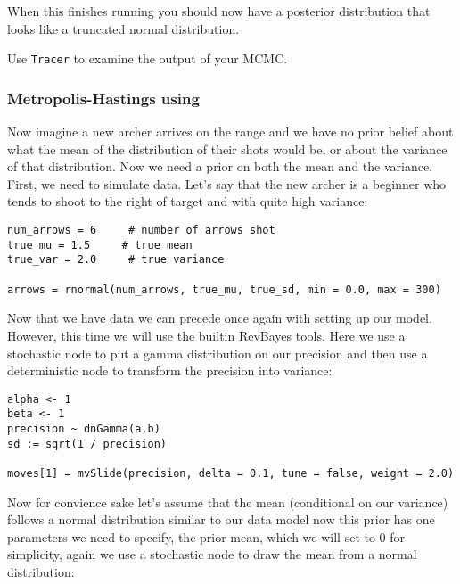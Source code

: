 When this finishes running you should now have a posterior distribution that looks like a truncated normal distribution. 

{\begin{framed}

Use {\tt Tracer} to examine the output of your MCMC. 

\end{framed}}



\subsubsection{Metropolis-Hastings using \RevBayes}

Now imagine a new archer arrives on the range and we have no prior belief about what the mean of the distribution of their shots would be, or about the variance of that distribution. Now we need a prior on both the mean and the variance. First, we need to simulate data. Let's say that the new archer is a beginner who tends to shoot to the right of target and with quite high variance:

{\tt \begin{snugshade*}
\begin{lstlisting}
num_arrows = 6     # number of arrows shot
true_mu = 1.5     # true mean
true_var = 2.0     # true variance

arrows = rnormal(num_arrows, true_mu, true_sd, min = 0.0, max = 300)
\end{lstlisting}
\end{snugshade*}}

Now that we have data we can precede once again with setting up our model. However, this time we will use the builtin RevBayes tools. Here we use a stochastic node to put a gamma distribution on our precision and then use a deterministic node to transform the precision into variance:

{\tt \begin{snugshade*}
 \begin{lstlisting}
alpha <- 1
beta <- 1
precision ~ dnGamma(a,b) 
sd := sqrt(1 / precision)

moves[1] = mvSlide(precision, delta = 0.1, tune = false, weight = 2.0)
\end{lstlisting}
\end{snugshade*}}

Now for convience sake let's assume that the mean (conditional on our variance) follows a normal distribution similar to our data model now this prior has one parameters we need to specify, the prior mean, which we will set to 0 for simplicity, again we use a stochastic node to draw the mean from a normal distribution:

